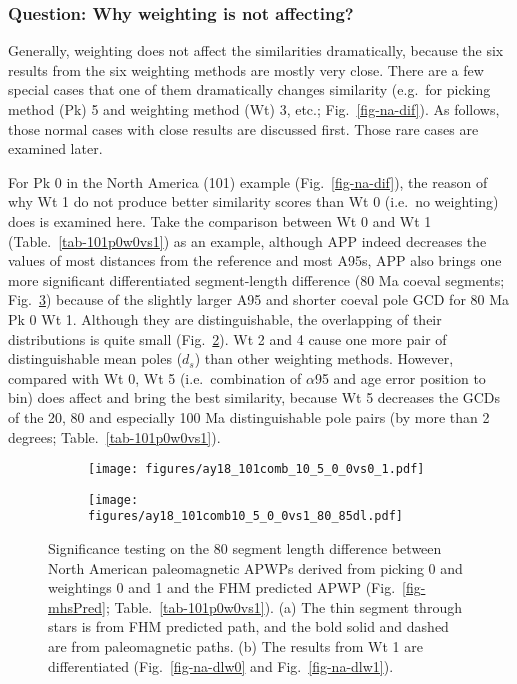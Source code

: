 \subsubsection{Question: Why weighting is not affecting?}

Generally, weighting does not affect the similarities dramatically, because the
six results from the six weighting methods are mostly very close. There are a
few special cases that one of them dramatically changes similarity (e.g.\ for
picking method (Pk) 5 and weighting method (Wt) 3, etc.;
Fig.~\ref{fig-na-dif}). As follows, those normal cases with close results are
discussed first. Those rare cases are examined later.

For Pk 0 in the North America (101) example (Fig.~\ref{fig-na-dif}), the reason
of why Wt 1 do not produce better similarity scores than Wt 0 (i.e.\
no weighting) does is examined here. Take the comparison between Wt 0 and Wt 1
(Table.~\ref{tab-101p0w0vs1}) as an example, although APP indeed decreases the
values of most distances from the reference and most A95s, APP also brings one
more significant differentiated segment-length difference (80\textendash85 Ma
coeval segments; Fig.~\ref{fig-101_8085}) because of the slightly larger A95 and
shorter coeval pole GCD for 80 Ma Pk 0 Wt 1. Although they are distinguishable,
the overlapping of their distributions is quite small
(Fig.~\ref{fig-nac105_00vs01dl}). Wt 2 and 4 cause one more pair of
distinguishable mean poles ($d_s$) than other weighting methods. However,
compared with Wt 0, Wt 5 (i.e.\ combination of $\alpha$95 and age error position
to bin) does affect and bring the best similarity, because Wt 5 decreases the
GCDs of the 20, 80 and especially 100 Ma distinguishable pole pairs (by more
than 2 degrees; Table.~\ref{tab-101p0w0vs1}).

\begin{figure}
\captionsetup[subfigure]{singlelinecheck=off,justification=raggedright,aboveskip=-6pt,belowskip=-6pt}
	\centering
	\begin{subfigure}{.49\textwidth}
		\caption{}\label{fig-nac105_00vs01}
		\texttt{[image: figures/ay18\_101comb\_10\_5\_0\_0vs0\_1.pdf]}
	\end{subfigure}
	\vspace{1em}
	\begin{subfigure}{.49\textwidth}
		\caption{}\label{fig-nac105_00vs01dl}
		\texttt{[image: figures/ay18\_101comb10\_5\_0\_0vs1\_80\_85dl.pdf]}
	\end{subfigure}
	\caption[101 10 5 0 0 vs 0 1 80 Ma dl]{Significance testing on
the 80\textendash85 segment length difference between North American
paleomagnetic APWPs derived from picking 0 and weightings 0 and 1 and the FHM
predicted APWP (Fig.~\ref{fig-mhsPred}; Table.~\ref{tab-101p0w0vs1}). (a) The
thin segment through stars is from FHM predicted path, and the bold solid and
dashed are from paleomagnetic paths. (b) The results from Wt 1 are
differentiated (Fig.~\ref{fig-na-dlw0} and
Fig.~\ref{fig-na-dlw1}).}\label{fig-101_8085}
\end{figure}

